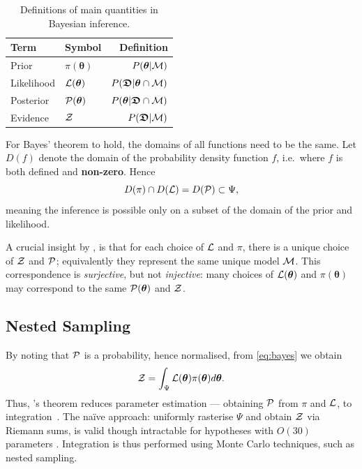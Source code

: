 \documentclass[usenatbib]{mnras}
\begin{document}
\begin{table}
  \caption{Definitions of main quantities in Bayesian inference.   \label{table-defs}}
\centering
\begin{tabular}{llr}
\textbf{\textbf{Term}} & \textbf{\textbf{Symbol}} & \textbf{\textbf{Definition}}\\
\hline
  Prior  & \(\pi(\bm{\theta})\) & \(P ( \bm{\theta}  \vert {\cal M})\) \\
  Likelihood  & \({\cal L}(\bm{\theta})\) & \(P ( \bm{\mathfrak{D}} \vert \bm{\theta} \cap {\cal M})\) \\
  Posterior  & \({\cal P}(\bm{\theta})\) & \(P ( \bm{\theta} \vert \bm{\mathfrak{D}} \cap {\cal M})\) \\
Evidence & \({\cal Z}\) & \(P ( \bm{\mathfrak{D}} \vert {\cal M})\) \\
\end{tabular}
\end{table}


For Bayes' theorem to hold, the domains of all functions need to be
the same. Let \(D(f)\) denote the domain of the probability density
function \(f\), i.e.~where \(f\) is both defined and
\textbf{non-zero}. Hence
\begin{equation}
  D(\pi) \cap D({\cal L})  = D({\cal P}) \subset \Psi,
\end{equation} 
meaning the inference is possible only on a subset of the domain of
the prior and likelihood.\label{domain-discussion}

A crucial insight by \cite{chen-ferroz-hobson}, is that for each
choice of ${\cal L}$ and $\pi$, there is a unique choice of ${\cal Z}$
and ${\cal P}$; equivalently they represent the same unique model
${\cal M}$. This correspondence is \emph{surjective}, but not
\emph{injective}: many choices of \({\cal L}(\bm{\theta})\) and
\(\pi (\bm{\theta})\) may correspond to the same
\( {\cal P} (\bm{\theta})\) and \({\cal Z}\).


\subsection{Nested Sampling}\label{sec:org36366f8}

By noting that ${\cal P}$ is a probability, hence normalised, from
\cref{eq:bayes} we obtain
\begin{equation}
  \label{eq:def-z}
  {\cal Z} = \int_{\Psi} {\cal L}(\bm{\theta}) \pi(\bm{\theta}) d\bm{\theta}. 
\end{equation}
Thus, \citeauthor{1763}'s theorem reduces parameter estimation ---
obtaining ${\cal P}$ from $\pi$ and ${\cal L}$, to
integration~\citep{bayes-integration}. The naïve approach: uniformly
rasterise \(\Psi\) and obtain \({\cal Z}\) via Riemann sums, is valid
though intractable for hypotheses with \(O(30)\) parameters
\citep{Caflisch_1998}. Integration is thus performed using Monte Carlo
techniques, such as nested sampling.
\end{document}
